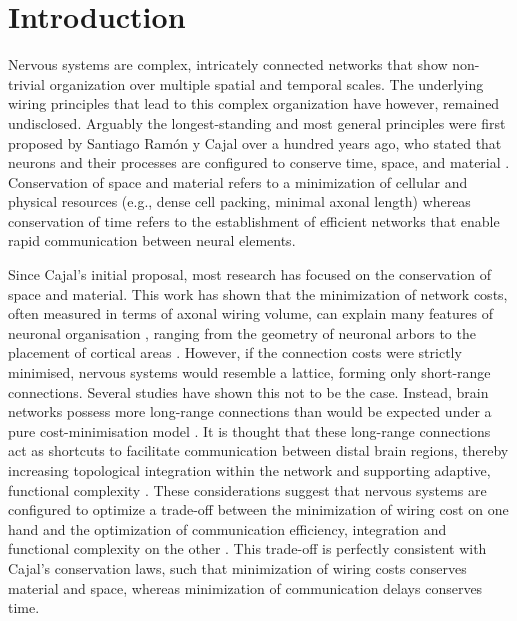 \section{Introduction}

Nervous systems are complex, intricately connected networks that show non-trivial organization over multiple spatial and temporal scales. The underlying wiring principles that lead to this complex organization have however, remained undisclosed. Arguably the longest-standing and most general principles were first proposed by Santiago Ramón y Cajal over a hundred years ago, who stated that neurons and their processes are configured to conserve time, space, and material \citep{RamonyCajal1995}. Conservation of space and material refers to a minimization of cellular and physical resources (e.g., dense cell packing, minimal axonal length) whereas conservation of time refers to the establishment of efficient networks that enable rapid communication between neural elements.

Since Cajal’s initial proposal, most research has focused on the conservation of space and material. This work has shown that the minimization of network costs, often measured in terms of axonal wiring volume, can explain many features of neuronal organisation \citep{Cherniak1994,Chklovskii2002,Klyachko2003,Rivera-Alba2011,Wen2005}, ranging from the geometry of neuronal arbors \citep{Cherniak1999} to the placement of cortical areas \citep{Cherniak2004}. However, if the connection costs were strictly minimised, nervous systems would resemble a lattice, forming only short-range connections. Several studies have shown this not to be the case. Instead, brain networks possess more long-range connections than would be expected under a pure cost-minimisation model \citep{Bassett2006,Bullmore2012,Kaiser2006}. It is thought that these long-range connections act as shortcuts to facilitate communication between distal brain regions, thereby increasing topological integration within the network \citep{Bullmore2012,Buzsaki2004a,VandenHeuvel2012} and supporting adaptive, functional complexity \citep{Betzel2018}. These considerations suggest that nervous systems are configured to optimize a trade-off between the minimization of wiring cost on one hand and the optimization of communication efficiency, integration and functional complexity on the other \citep{Bullmore2012}. This trade-off is perfectly consistent with Cajal’s conservation laws, such that minimization of wiring costs conserves material and space, whereas minimization of communication delays conserves time.

